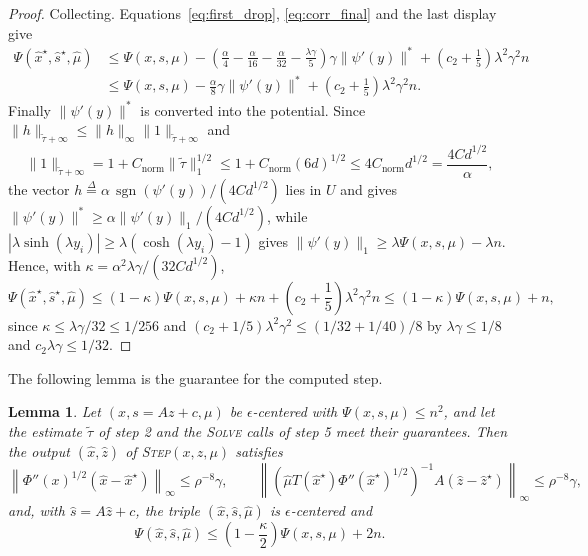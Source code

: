 \documentclass[11pt]{article}
\newtheorem{lemma}{Lemma}[section]
\newcommand{\xhat}{\widehat{x}}
\newcommand{\shat}{\widehat{s}}
\newcommand{\zhat}{\widehat{z}}
\newcommand{\muhat}{\widehat{\mu}}
\newcommand{\tautil}{\widetilde{\tau}}
\newcommand{\sgn}{\operatorname{sgn}}
\newcommand{\defeq}{\stackrel{\Delta}{=}}
\newcommand{\Cnorm}{C_{\mathrm{norm}}}
\begin{document}
\begin{proof}
Collecting.
Equations~\eqref{eq:first_drop}, \eqref{eq:corr_final} and the last display give
\[
\begin{aligned}
\Psi(\xhat^{\star}, \shat^{\star}, \muhat)
&\le
\Psi(x, s, \mu)
- \left( \frac{\alpha}{4} - \frac{\alpha}{16} - \frac{\alpha}{32}
- \frac{\lambda \gamma}{5} \right) \gamma \|\psi'(y)\|^{*}
+ \left( c_{2} + \frac{1}{5} \right) \lambda^{2} \gamma^{2} n
\\
&\le
\Psi(x, s, \mu)
- \frac{\alpha}{8} \gamma \|\psi'(y)\|^{*}
+ \left( c_{2} + \frac{1}{5} \right) \lambda^{2} \gamma^{2} n .
\end{aligned}
\]
Finally $\|\psi'(y)\|^{*}$ is converted into the potential.
Since $\|h\|_{\tautil + \infty} \le \|h\|_{\infty} \|1\|_{\tautil + \infty}$ and
\[
\|1\|_{\tautil + \infty}
=
1 + \Cnorm \|\tautil\|_1^{1/2}
\le
1 + \Cnorm (6 d)^{1/2}
\le
4 \Cnorm d^{1/2}
=
\frac{4 C d^{1/2}}{\alpha},
\]
the vector $h \defeq \alpha \, \sgn(\psi'(y)) / (4 C d^{1/2})$ lies in
$U$ and gives
$\|\psi'(y)\|^{*} \ge \alpha \|\psi'(y)\|_1 / (4 C d^{1/2})$, while
$|\lambda \sinh(\lambda y_i)| \ge \lambda (\cosh(\lambda y_i) - 1)$ gives
$\|\psi'(y)\|_1 \ge \lambda \Psi(x, s, \mu) - \lambda n$.
Hence, with $\kappa = \alpha^{2} \lambda \gamma / (32 C d^{1/2})$,
\[
\Psi(\xhat^{\star}, \shat^{\star}, \muhat)
\le
\left( 1 - \kappa \right) \Psi(x, s, \mu)
+ \kappa n
+ \left( c_{2} + \frac{1}{5} \right) \lambda^{2} \gamma^{2} n
\le
\left( 1 - \kappa \right) \Psi(x, s, \mu) + n,
\]
since $\kappa \le \lambda \gamma / 32 \le 1 / 256$ and
$(c_{2} + 1/5) \lambda^{2} \gamma^{2} \le (1 / 32 + 1 / 40) / 8$ by
$\lambda \gamma \le 1 / 8$ and
$c_{2} \lambda \gamma \le 1 / 32$.
\end{proof}

The following lemma is the guarantee for the computed step.

\begin{lemma}
\label{lem:computed_step}
Let $(x, s = A z + c, \mu)$ be
$\epsilon$-centered with
$\Psi(x, s, \mu) \le n^{2}$, and let the estimate
$\tautil$ of step 2 and the \textsc{Solve} calls of step 5 meet their
guarantees.
Then the output $(\xhat, \zhat)$ of
\textsc{Step}$(x, z, \mu)$ satisfies
\[
\left\| \Phi''(x)^{1/2} \left( \xhat - \xhat^{\star} \right)
\right\|_{\infty}
\le \rho^{-8} \gamma,
\qquad
\left\| \left( \muhat T(\xhat^{\star})
\Phi''(\xhat^{\star})^{1/2} \right)^{-1}
A \left( \zhat - \zhat^{\star} \right) \right\|_{\infty}
\le \rho^{-8} \gamma,
\]
and, with $\shat = A \zhat + c$, the triple
$(\xhat, \shat, \muhat)$ is
$\epsilon$-centered and
\[
\Psi(\xhat, \shat, \muhat)
\le
\left( 1 - \frac{\kappa}{2} \right) \Psi(x, s, \mu) + 2 n .
\]
\end{lemma}
\end{document}
